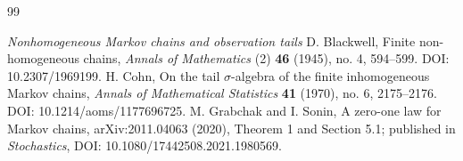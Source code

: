 \begin{thebibliography}{99}
\item[]\textit{Nonhomogeneous Markov chains and observation tails}
 D. Blackwell, Finite non-homogeneous chains, \emph{Annals of Mathematics} (2) \textbf{46} (1945), no. 4, 594--599. DOI: 10.2307/1969199.
 H. Cohn, On the tail $\sigma$-algebra of the finite inhomogeneous Markov chains, \emph{Annals of Mathematical Statistics} \textbf{41} (1970), no. 6, 2175--2176. DOI: 10.1214/aoms/1177696725.
 M. Grabchak and I. Sonin, A zero-one law for Markov chains, arXiv:2011.04063 (2020), Theorem 1 and Section 5.1; published in \emph{Stochastics}, DOI: 10.1080/17442508.2021.1980569.
\end{thebibliography}
